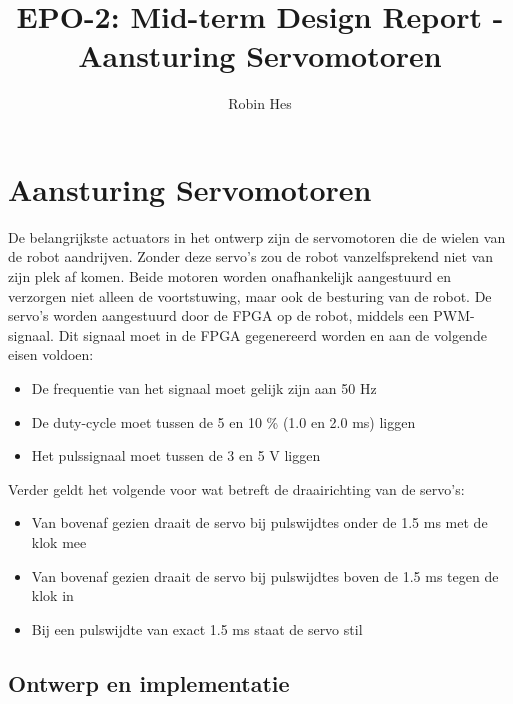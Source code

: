 \documentclass{report}
\title{EPO-2: Mid-term Design Report - Aansturing Servomotoren}
\author{Robin Hes}
\begin{document}
\chapter{Aansturing Servomotoren}
\label{ch:servo}

De belangrijkste actuators in het ontwerp zijn de servomotoren die de wielen van de robot aandrijven. Zonder deze servo's zou de robot vanzelfsprekend niet van zijn plek af komen. Beide motoren worden onafhankelijk aangestuurd en verzorgen niet alleen de voortstuwing, maar ook de besturing van de robot. De servo's worden aangestuurd door de FPGA op de robot, middels een PWM-signaal. Dit signaal moet in de FPGA gegenereerd worden en aan de volgende eisen voldoen:

\begin{itemize}
	\item De frequentie van het signaal moet gelijk zijn aan 50 Hz
	\item De duty-cycle moet tussen de 5 en 10 \% (1.0 en 2.0 ms) liggen
	\item Het pulssignaal moet tussen de 3 en 5 V liggen
\end{itemize}

\noindent
Verder geldt het volgende voor wat betreft de draairichting van de servo's:

\begin{itemize}
	\item Van bovenaf gezien draait de servo bij pulswijdtes onder de 1.5 ms met de klok mee
	\item Van bovenaf gezien draait de servo bij pulswijdtes boven de 1.5 ms tegen de klok in
	\item Bij een pulswijdte van exact 1.5 ms staat de servo stil
\end{itemize}

\section{Ontwerp en implementatie}
\label{sec:servo-design}
\end{document}
